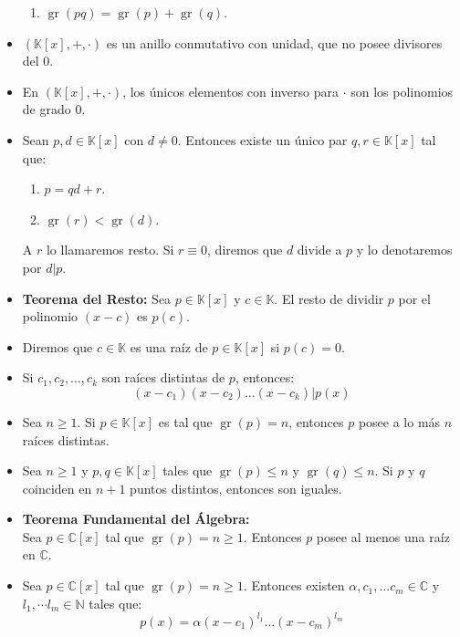 \documentclass[letterpaper,10pt]{article}
\newcommand{\N}{\mathbb N}
\newcommand{\K}{\mathbb K}
\newcommand{\C}{\mathbb C}
\DeclareMathOperator{\gr}{gr}
\theoremstyle{plain}
\begin{document}
\begin{framed}
\begin{multicols}{2}
\begin{itemize}
\begin{enumerate}
			\item $\gr(pq ) = \gr(p)+ \gr(q)$.
		\end{enumerate}
		\item $(\K[x],+,\cdot)$ es un anillo conmutativo con unidad, que no posee divisores del 0.
		\item En $(\K[x],+,\cdot)$, los únicos elementos con inverso para $\cdot$ son los polinomios de grado 0.	
		\item Sean $p,d \in \K[x]$ con $d \neq 0$. Entonces existe un único par $q,r \in \K[x]$ tal que:
		\begin{enumerate}
			\item $p=qd+r$.
			\item $\gr(r)<\gr(d)$.
		\end{enumerate}
		A $r$ lo llamaremos resto.
		Si $r\equiv 0$, diremos que $d$ divide a $p$ y lo denotaremos por $d|p$.	
		\item \textbf{Teorema del Resto:} Sea $p \in \K[x]$ y $c \in \K$. El resto de dividir $p$ por el polinomio $(x-c)$ es $p(c)$.
		\item Diremos que $c \in \K$ es una raíz de $p \in \K[x]$ si $p(c)=0$.
		\item Si $c_1,c_2, \dotso, c_k$ son raíces distintas de $p$, entonces:
		$$
		(x-c_1)(x-c_2)\dotso (x-c_k) | p(x)
		$$
		\item Sea $n \geq 1$. Si $p \in \K[x]$ es tal que $\gr(p)=n$, entonces $p $ posee a lo más $n$ raíces distintas.
		\item Sea $n \geq 1$ y $p,q \in \K[x]$ tales que $\gr (p) \leq n$ y $\gr(q ) \leq n$. Si $p$ y $q $ coinciden en $n+1$ puntos distintos, entonces son iguales.
		\item \textbf{Teorema Fundamental del Álgebra:} \\Sea $p \in \C[x]$ tal que $\gr(p)=n \geq 1$. Entonces $p$ posee al menos una raíz en $\C$.
			

		\item Sea $p \in \C[x]$ tal que $\gr(p)=n \geq 1$. Entonces existen $\alpha,c_1, \dotso c_m \in \C$ y $l_1, \dotsm l_m \in \N$ tales que:
		$$
		p(x)= \alpha (x-c_1)^{l_1} \dotso (x-c_m)^{l_m}
		$$
		\end{itemize}
		\end{multicols}
\end{framed}
\end{document}
